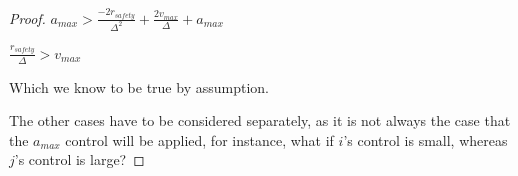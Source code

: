 \documentclass[10pt, conference, compsocconf]{IEEEtran}
\begin{document}
\begin{proof}
$a_{max} > \frac{-2\mathit{r_{safety}}}{\Delta^2} + \frac{2v_{max}}{\Delta} + a_{max}$

$\frac{\mathit{r_{safety}}}{\Delta} > v_{max}$

Which we know to be true by assumption.

The other cases have to be considered separately, as it is not always the case that the $a_{max}$ control will be applied, for instance, what if $i$'s control is small, whereas $j$'s control is large?

%
%
%
%
%
%
%
%
%
%
%
%
%
\end{proof}

%
%
\end{document}
